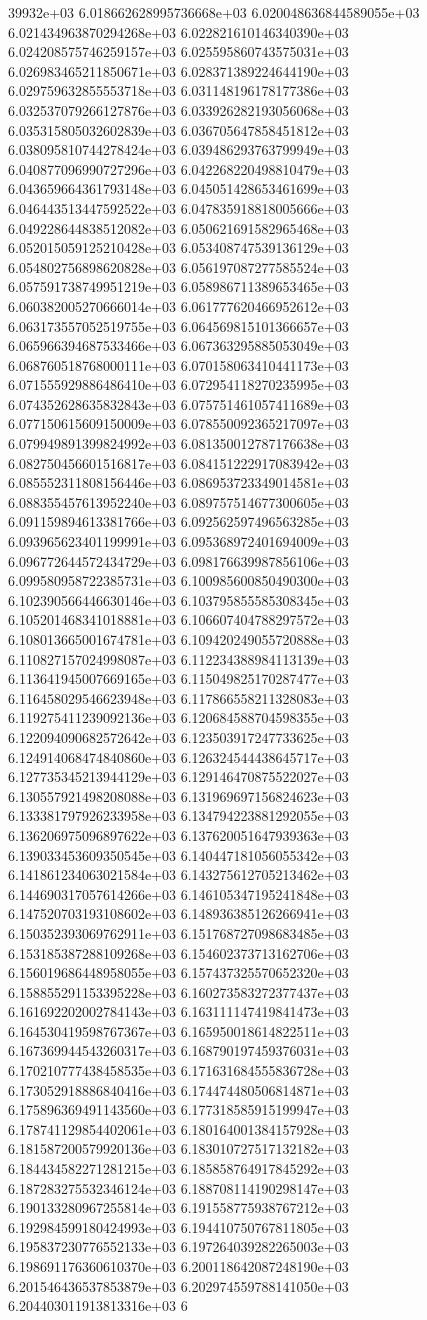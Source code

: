 39932e+03	6.018662628995736668e+03	6.020048636844589055e+03	6.021434963870294268e+03	6.022821610146340390e+03	6.024208575746259157e+03	6.025595860743575031e+03	6.026983465211850671e+03	6.028371389224644190e+03	6.029759632855553718e+03	6.031148196178177386e+03	6.032537079266127876e+03	6.033926282193056068e+03	6.035315805032602839e+03	6.036705647858451812e+03	6.038095810744278424e+03	6.039486293763799949e+03	6.040877096990727296e+03	6.042268220498810479e+03	6.043659664361793148e+03	6.045051428653461699e+03	6.046443513447592522e+03	6.047835918818005666e+03	6.049228644838512082e+03	6.050621691582965468e+03	6.052015059125210428e+03	6.053408747539136129e+03	6.054802756898620828e+03	6.056197087277585524e+03	6.057591738749951219e+03	6.058986711389653465e+03	6.060382005270666014e+03	6.061777620466952612e+03	6.063173557052519755e+03	6.064569815101366657e+03	6.065966394687533466e+03	6.067363295885053049e+03	6.068760518768000111e+03	6.070158063410441173e+03	6.071555929886486410e+03	6.072954118270235995e+03	6.074352628635832843e+03	6.075751461057411689e+03	6.077150615609150009e+03	6.078550092365217097e+03	6.079949891399824992e+03	6.081350012787176638e+03	6.082750456601516817e+03	6.084151222917083942e+03	6.085552311808156446e+03	6.086953723349014581e+03	6.088355457613952240e+03	6.089757514677300605e+03	6.091159894613381766e+03	6.092562597496563285e+03	6.093965623401199991e+03	6.095368972401694009e+03	6.096772644572434729e+03	6.098176639987856106e+03	6.099580958722385731e+03	6.100985600850490300e+03	6.102390566446630146e+03	6.103795855585308345e+03	6.105201468341018881e+03	6.106607404788297572e+03	6.108013665001674781e+03	6.109420249055720888e+03	6.110827157024998087e+03	6.112234388984113139e+03	6.113641945007669165e+03	6.115049825170287477e+03	6.116458029546623948e+03	6.117866558211328083e+03	6.119275411239092136e+03	6.120684588704598355e+03	6.122094090682572642e+03	6.123503917247733625e+03	6.124914068474840860e+03	6.126324544438645717e+03	6.127735345213944129e+03	6.129146470875522027e+03	6.130557921498208088e+03	6.131969697156824623e+03	6.133381797926233958e+03	6.134794223881292055e+03	6.136206975096897622e+03	6.137620051647939363e+03	6.139033453609350545e+03	6.140447181056055342e+03	6.141861234063021584e+03	6.143275612705213462e+03	6.144690317057614266e+03	6.146105347195241848e+03	6.147520703193108602e+03	6.148936385126266941e+03	6.150352393069762911e+03	6.151768727098683485e+03	6.153185387288109268e+03	6.154602373713162706e+03	6.156019686448958055e+03	6.157437325570652320e+03	6.158855291153395228e+03	6.160273583272377437e+03	6.161692202002784143e+03	6.163111147419841473e+03	6.164530419598767367e+03	6.165950018614822511e+03	6.167369944543260317e+03	6.168790197459376031e+03	6.170210777438458535e+03	6.171631684555836728e+03	6.173052918886840416e+03	6.174474480506814871e+03	6.175896369491143560e+03	6.177318585915199947e+03	6.178741129854402061e+03	6.180164001384157928e+03	6.181587200579920136e+03	6.183010727517132182e+03	6.184434582271281215e+03	6.185858764917845292e+03	6.187283275532346124e+03	6.188708114190298147e+03	6.190133280967255814e+03	6.191558775938767212e+03	6.192984599180424993e+03	6.194410750767811805e+03	6.195837230776552133e+03	6.197264039282265003e+03	6.198691176360610370e+03	6.200118642087248190e+03	6.201546436537853879e+03	6.202974559788141050e+03	6.204403011913813316e+03	6
